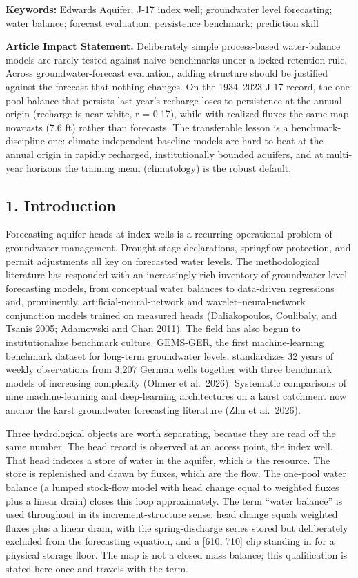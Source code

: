 \documentclass[11pt]{article}
\begin{document}
\textbf{Keywords:} Edwards Aquifer; J-17 index well; groundwater level
forecasting; water balance; forecast evaluation; persistence benchmark;
prediction skill

\textbf{Article Impact Statement.} Deliberately simple process-based
water-balance models are rarely tested against naive benchmarks under a
locked retention rule. Across groundwater-forecast evaluation, adding
structure should be justified against the forecast that nothing changes.
On the 1934--2023 J-17 record, the one-pool balance that persists last
year's recharge loses to persistence at the annual origin (recharge is
near-white, r = 0.17), while with realized fluxes the same map nowcasts
(7.6 ft) rather than forecasts. The transferable lesson is a
benchmark-discipline one: climate-independent baseline models are hard
to beat at the annual origin in rapidly recharged, institutionally
bounded aquifers, and at multi-year horizons the training mean (climatology)
is the robust default.

\subsection{1. Introduction}\label{introduction}

Forecasting aquifer heads at index wells is a recurring operational
problem of groundwater management. Drought-stage declarations,
springflow protection, and permit adjustments all key on forecasted
water levels. The methodological literature has responded with an
increasingly rich inventory of groundwater-level forecasting models,
from conceptual water balances to data-driven regressions and,
prominently, artificial-neural-network and wavelet--neural-network
conjunction models trained on measured heads (Daliakopoulos, Coulibaly,
and Tsanis 2005; Adamowski and Chan 2011). The field has also begun to
institutionalize benchmark culture. GEMS-GER, the first machine-learning
benchmark dataset for long-term groundwater levels, standardizes 32
years of weekly observations from 3,207 German wells together with three
benchmark models of increasing complexity (Ohmer et al.~2026).
Systematic comparisons of nine machine-learning and deep-learning
architectures on a karst catchment now anchor the karst groundwater
forecasting literature (Zhu et al.~2026).

Three hydrological objects are worth separating, because they are read
off the same number. The head record is observed at an access point, the
index well. That head indexes a store of water in the aquifer, which is
the resource. The store is replenished and drawn by fluxes, which are
the flow. The one-pool water balance (a lumped stock-flow model with
head change equal to weighted fluxes plus a linear drain) closes this
loop approximately. The term ``water balance'' is used throughout in its
increment-structure sense: head change equals weighted fluxes plus a
linear drain, with the spring-discharge series stored but deliberately
excluded from the forecasting equation, and a {[}610, 710{]} clip
standing in for a physical storage floor. The map is not a closed mass
balance; this qualification is stated here once and travels with the
term.
\end{document}
